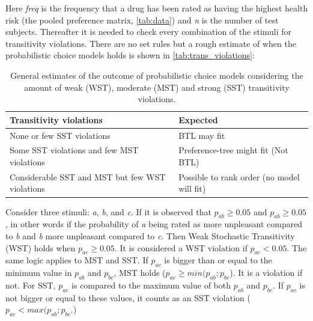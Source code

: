 \noindent
%
Here \textit{freq} is the frequency that a drug has been rated as having the highest health risk (the pooled preference matrix, \autoref{tab:data}) and \textit{n} is the number of test subjects. Thereafter it is needed to check every combination of the stimuli for transitivity violations. There are no set rules but a rough estimate of when the probabilistic choice models holds is shown in \autoref{tab:trans_violations}:
%
\begin{table}[H]
\centering
\begin{tabular}{@{}ll@{}}
\toprule
Transitivity violations                                    & Expected                                      \\ \midrule
None or few SST violations                                 & BTL may fit                                   \\
Some SST violations and few MST violations                 & Preference-tree might fit (Not BTL)            \\
Considerable SST and MST but few WST violations & Possible to rank order (no model will fit) \\ \bottomrule
\end{tabular}
\caption{General estimates of the outcome of probabilistic choice models considering the amount of weak (WST), moderate (MST) and strong (SST) transitivity violations.}
\label{tab:trans_violations}
\end{table}
\noindent
%
Consider three stimuli: \textit{a}, \textit{b}, and \textit{c}. If it is observed that $p_{ab} \geq 0.05$ and $p_{ab} \geq 0.05$, in other words if the probability of \textit{a} being rated as more unpleasant compared to \textit{b} and \textit{b} more unpleasant compared to \textit{c}. Then Weak Stochastic Transitivity (WST) holds when $p_{ac} \geq 0.05$. It is considered a WST violation if $p_{ac} < 0.05$. The same logic applies to MST and SST. If $p_{ac}$ is bigger than or equal to the minimum value in $p_{ab}$ and $p_{bc}$, MST holds ($p_{ac}\geq min(p_{ab};p_{bc}$). It is a violation if not. For SST, $p_{ac}$ is compared to the maximum value of both $p_{ab}$ and $p_{bc}$. If $p_{ac}$ is not bigger or equal to these values, it counts as an SST violation ($p_{ac}< max(p_{ab};p_{bc}$.)

